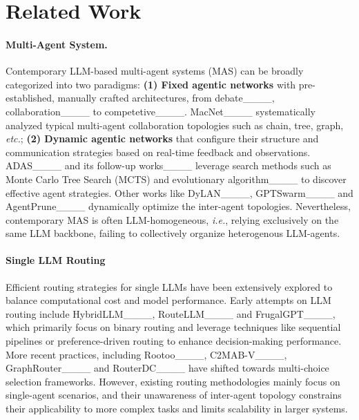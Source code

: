 \section{Related Work}
\vspace{-0.4em}
\paragraph {Multi-Agent System.}
Contemporary LLM-based multi-agent systems (MAS) can be broadly categorized into two paradigms: \textbf{(1) Fixed agentic networks} with pre-established, manually crafted architectures, from debate____, collaboration____ to competetive____. MacNet____ systematically analyzed typical multi-agent collaboration topologies such as chain, tree, graph, \textit{etc.}; \textbf{(2) Dynamic agentic networks} that configure their structure and communication strategies based on real-time feedback and observations. ADAS____ and its follow-up works____ leverage search methods such as Monte Carlo Tree Search (MCTS) and evolutionary algorithm____ to discover effective agent strategies. Other works like DyLAN____, GPTSwarm____ and AgentPrune____ dynamically optimize the inter-agent topologies. Nevertheless, contemporary MAS is often LLM-homogeneous, \textit{i.e.}, relying exclusively on the same LLM backbone, failing to collectively organize heterogenous LLM-agents.


\vspace{-0.4em}
\paragraph{Single LLM Routing}
Efficient routing strategies for single LLMs have been extensively explored to balance computational cost and model performance.
Early attempts on LLM routing include HybridLLM____, RouteLLM____ and FrugalGPT____, which primarily focus on binary routing and leverage techniques like sequential pipelines or preference-driven routing to enhance decision-making performance. More recent practices, including Rootoo____, C2MAB-V____, GraphRouter____ and RouterDC____ have shifted towards multi-choice selection frameworks. However, existing routing methodologies mainly focus on single-agent scenarios, and their unawareness of inter-agent topology constrains their applicability to more complex tasks and limits scalability in larger systems.